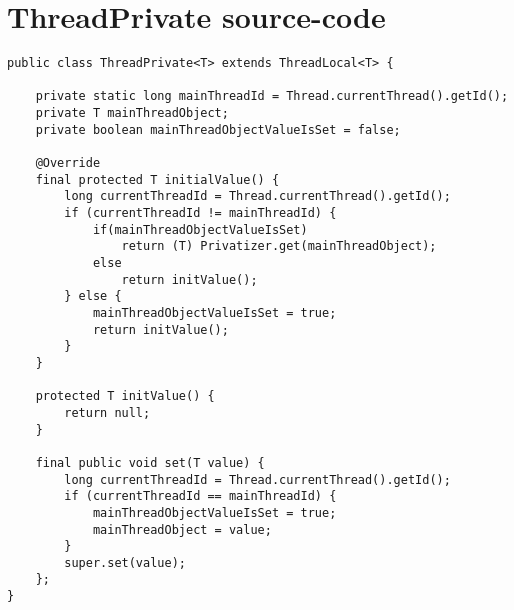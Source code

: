 \chapter{ThreadPrivate source-code}\label{ap:TP}
\begin{lstlisting}[caption={}, label =
{code:threadprivate}]
public class ThreadPrivate<T> extends ThreadLocal<T> {

	private static long mainThreadId = Thread.currentThread().getId();
	private T mainThreadObject;
	private boolean mainThreadObjectValueIsSet = false;

	@Override
	final protected T initialValue() {
		long currentThreadId = Thread.currentThread().getId();
		if (currentThreadId != mainThreadId) {
			if(mainThreadObjectValueIsSet)
				return (T) Privatizer.get(mainThreadObject);
			else
				return initValue(); 
		} else {
			mainThreadObjectValueIsSet = true;
			return initValue();
		}
	}

	protected T initValue() {
		return null;
	}

	final public void set(T value) {
		long currentThreadId = Thread.currentThread().getId();
		if (currentThreadId == mainThreadId) {
			mainThreadObjectValueIsSet = true;
			mainThreadObject = value;
		}	
		super.set(value);
	};
}

\end{lstlisting}